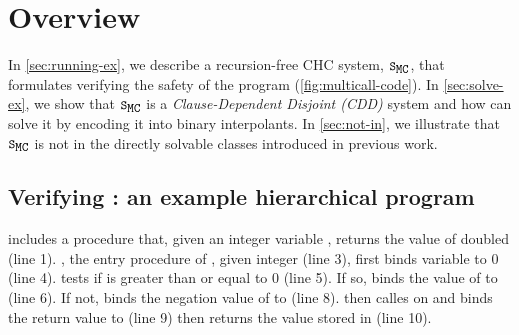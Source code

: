 \section{Overview}
\label{sec:overview}

In \autoref{sec:running-ex}, we describe a recursion-free CHC system,
$\mcchc$, that formulates verifying the safety of the program
 (\autoref{fig:multicall-code}).
%
In \autoref{sec:solve-ex}, we show that $\mcchc$ is a
\emph{Clause-Dependent Disjoint (CDD)} system and how \sys can solve it by 
encoding it into binary interpolants.
%
In \autoref{sec:not-in}, we illustrate that
$\mcchc$ is not in the directly solvable classes introduced in
previous work.
%


\subsection{Verifying : an example hierarchical program}
\label{sec:running-ex}

\begin{figure}[t]
  \centering
  \begin{floatrow}[2]
    {  }
      {}
  \end{floatrow}
\end{figure}
%
 includes a procedure  that, given an integer
variable , returns the value of  doubled (line 1).
%
, the entry procedure of , given integer 
(line 3), first binds variable  to $0$ (line 4).
%
 tests if  is greater than or equal to $0$ (line
5).
%
If so,  binds the value of  to  (line 6).
%
If not,  binds the negation value of  to  (line 8).
%
 then calles  on  and binds the return value to  (line 9)
%
 then returns the value stored in  (line 10).

